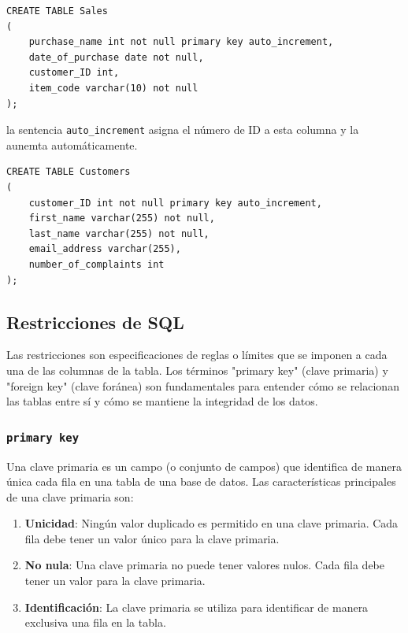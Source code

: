  \begin{verbatim}
CREATE TABLE Sales
(
	purchase_name int not null primary key auto_increment,
	date_of_purchase date not null,
    customer_ID int,
    item_code varchar(10) not null
);
 \end{verbatim}
 
la sentencia \texttt{auto\_increment} asigna el número de ID a esta columna y la aunemta automáticamente. \\

\begin{verbatim}
CREATE TABLE Customers
(
	customer_ID int not null primary key auto_increment,
    first_name varchar(255) not null,
    last_name varchar(255) not null,
    email_address varchar(255),
    number_of_complaints int
);
\end{verbatim}



\subsection{Restricciones de SQL}

Las restricciones son especificaciones de reglas o límites que se imponen a cada una de las columnas de la tabla. Los términos "primary key" (clave primaria) y "foreign key" (clave foránea) son fundamentales para entender cómo se relacionan las tablas entre sí y cómo se mantiene la integridad de los datos.

\subsubsection{\texttt{primary key}}

Una clave primaria es un campo (o conjunto de campos) que identifica de manera única cada fila en una tabla de una base de datos. Las características principales de una clave primaria son:

\begin{enumerate}
    \item \textbf{Unicidad}: Ningún valor duplicado es permitido en una clave primaria. Cada fila debe tener un valor único para la clave primaria.
    \item \textbf{No nula}: Una clave primaria no puede tener valores nulos. Cada fila debe tener un valor para la clave primaria.
    \item \textbf{Identificación}: La clave primaria se utiliza para identificar de manera exclusiva una fila en la tabla.

 

 
\end{enumerate}
 
